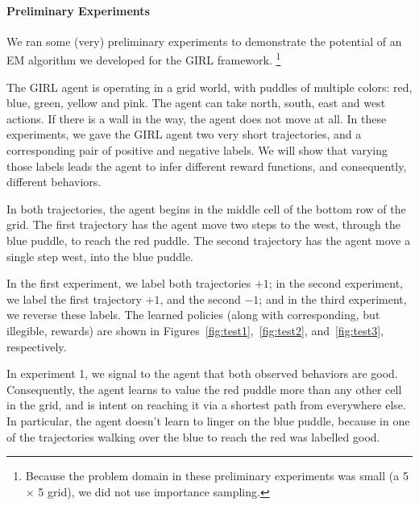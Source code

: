 
\vspace{\up}
\paragraph{Preliminary Experiments}

We ran some (very) preliminary experiments to demonstrate the
potential of an EM algorithm we developed for the GIRL framework.%
\footnote{Because the problem domain in these preliminary experiments
was small (a 5 $\times$ 5 grid), we did not use importance sampling.}

The GIRL agent is operating in a grid world, with puddles of multiple
colors: red, blue, green, yellow and pink. The agent can take north,
south, east and west actions.  If there is a wall in the way, the
agent does not move at all.
In these experiments, we gave the GIRL agent two very short
trajectories, and a corresponding pair of positive and negative
labels.  We will show that varying those labels leads the agent to
infer different reward functions, and consequently, different
behaviors.

In both trajectories, the agent begins in the middle cell of the
bottom row of the grid.  The first trajectory has the agent move two
steps to the west, through the blue puddle, to reach the red puddle.
The second trajectory has the agent move a single step west, into the
blue puddle.


In the first experiment, we label both trajectories $+1$; in the
second experiment, we label the first trajectory $+1$, and the second
$-1$; and in the third experiment, we reverse these labels.  The
learned policies (along with corresponding, but illegible, rewards)
are shown in Figures~\ref{fig:test1},~\ref{fig:test2},
and~\ref{fig:test3}, respectively.

In experiment 1, we signal to the agent that both observed behaviors
are good.  Consequently, the agent learns to value the red puddle more
than any other cell in the grid, and is intent on reaching it via a
shortest path from everywhere else.  In particular, the agent doesn't
learn to linger on the blue puddle, because in one of the trajectories
walking over the blue to reach the red was labelled good.

